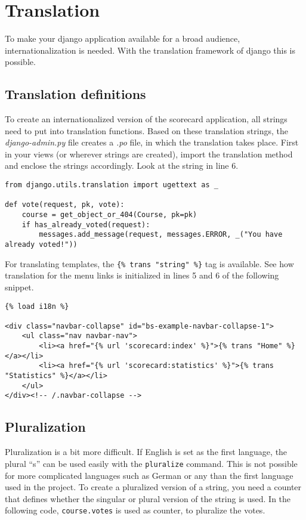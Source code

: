 \section{Translation}

To make your django application available for a broad audience, internationalization is needed. With the translation framework of django this is possible.

\subsection{Translation definitions}
To create an internationalized version of the scorecard application, all strings need to put into translation functions. Based on these translation strings, the \emph{django-admin.py} file creates a \emph{.po} file, in which the translation takes place. First in your views (or wherever strings are created), import the translation method and enclose the strings accordingly. Look at the string in line 6.

\begin{lstlisting}[style=Python, caption=exceprt of views.py with translation, label=lst:views.py_translation]
from django.utils.translation import ugettext as _

def vote(request, pk, vote):
    course = get_object_or_404(Course, pk=pk)
    if has_already_voted(request):
        messages.add_message(request, messages.ERROR, _("You have already voted!"))
\end{lstlisting}

For translating templates, the \lstinline|{% trans "string" %}| tag is available. See how translation for the menu links is initialized in lines 5 and 6 of the following snippet.

\begin{lstlisting}[style=HTML, caption=exceprt of base.html with translation, label=lst:base.html_translation]
{% load i18n %}

<div class="navbar-collapse" id="bs-example-navbar-collapse-1">
    <ul class="nav navbar-nav">
        <li><a href="{% url 'scorecard:index' %}">{% trans "Home" %}</a></li>
        <li><a href="{% url 'scorecard:statistics' %}">{% trans "Statistics" %}</a></li>
    </ul>
</div><!-- /.navbar-collapse -->
\end{lstlisting}

\subsection{Pluralization}
Pluralization is a bit more difficult. If English is set as the first language, the plural ``s'' can be used easily with the \lstinline|pluralize| command. This is not possible for more complicated languages such as German or any than the first language used in the project. To create a pluralized version of a string, you need a counter that defines whether the singular or plural version of the string is used. In the following code, \lstinline|course.votes| is used as counter, to pluralize the votes.

